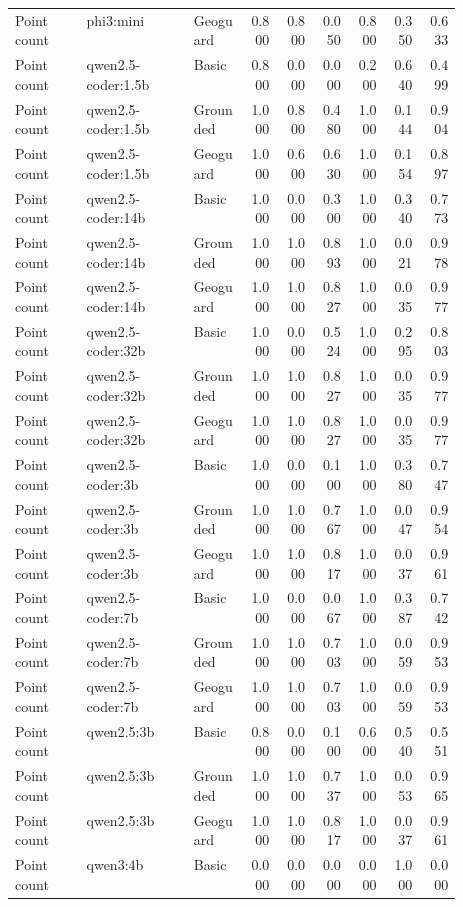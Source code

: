 \begin{longtable}{p{0.16\linewidth}p{0.24\linewidth}p{0.12\linewidth}rrrrrr}
Point count & phi3:mini & Geoguard & 0.800 & 0.800 & 0.050 & 0.800 & 0.350 & 0.633 \\
Point count & qwen2.5-coder:1.5b & Basic & 0.800 & 0.000 & 0.000 & 0.200 & 0.640 & 0.499 \\
Point count & qwen2.5-coder:1.5b & Grounded & 1.000 & 0.800 & 0.480 & 1.000 & 0.144 & 0.904 \\
Point count & qwen2.5-coder:1.5b & Geoguard & 1.000 & 0.600 & 0.630 & 1.000 & 0.154 & 0.897 \\
Point count & qwen2.5-coder:14b & Basic & 1.000 & 0.000 & 0.300 & 1.000 & 0.340 & 0.773 \\
Point count & qwen2.5-coder:14b & Grounded & 1.000 & 1.000 & 0.893 & 1.000 & 0.021 & 0.978 \\
Point count & qwen2.5-coder:14b & Geoguard & 1.000 & 1.000 & 0.827 & 1.000 & 0.035 & 0.977 \\
Point count & qwen2.5-coder:32b & Basic & 1.000 & 0.000 & 0.524 & 1.000 & 0.295 & 0.803 \\
Point count & qwen2.5-coder:32b & Grounded & 1.000 & 1.000 & 0.827 & 1.000 & 0.035 & 0.977 \\
Point count & qwen2.5-coder:32b & Geoguard & 1.000 & 1.000 & 0.827 & 1.000 & 0.035 & 0.977 \\
Point count & qwen2.5-coder:3b & Basic & 1.000 & 0.000 & 0.100 & 1.000 & 0.380 & 0.747 \\
Point count & qwen2.5-coder:3b & Grounded & 1.000 & 1.000 & 0.767 & 1.000 & 0.047 & 0.954 \\
Point count & qwen2.5-coder:3b & Geoguard & 1.000 & 1.000 & 0.817 & 1.000 & 0.037 & 0.961 \\
Point count & qwen2.5-coder:7b & Basic & 1.000 & 0.000 & 0.067 & 1.000 & 0.387 & 0.742 \\
Point count & qwen2.5-coder:7b & Grounded & 1.000 & 1.000 & 0.703 & 1.000 & 0.059 & 0.953 \\
Point count & qwen2.5-coder:7b & Geoguard & 1.000 & 1.000 & 0.703 & 1.000 & 0.059 & 0.953 \\
Point count & qwen2.5:3b & Basic & 0.800 & 0.000 & 0.100 & 0.600 & 0.540 & 0.551 \\
Point count & qwen2.5:3b & Grounded & 1.000 & 1.000 & 0.737 & 1.000 & 0.053 & 0.965 \\
Point count & qwen2.5:3b & Geoguard & 1.000 & 1.000 & 0.817 & 1.000 & 0.037 & 0.961 \\
Point count & qwen3:4b & Basic & 0.000 & 0.000 & 0.000 & 0.000 & 1.000 & 0.000 \\

\end{longtable}

